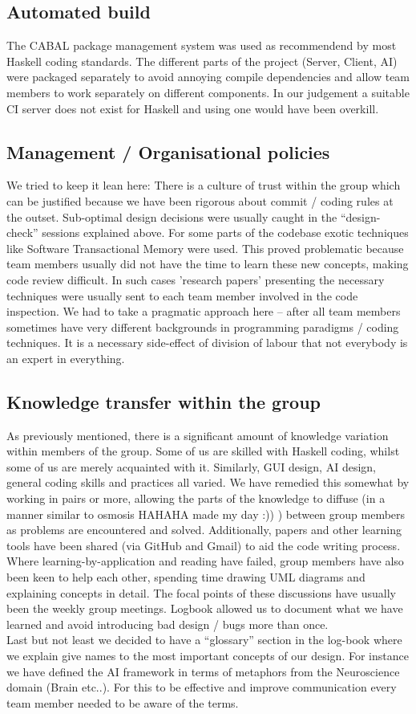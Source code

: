 \documentclass[11pt]{article}
\begin{document}
\subsection{Automated build}
The CABAL package management system was used as recommendend by most
Haskell coding standards. The different parts of the project (Server, Client,
AI) were packaged separately to avoid annoying compile dependencies and
allow team members to work separately on different components. In our judgement
a suitable CI server does not exist for Haskell and using one would have been 
overkill.

\subsection{Management / Organisational policies}
We tried to keep it lean here: There is a culture of trust within the group which
can be justified because we have been rigorous about commit / coding rules at the
outset. Sub-optimal design decisions were usually caught in the ``design-check'' sessions 
explained above. For some parts of the codebase exotic techniques like Software
Transactional Memory were used. This proved problematic because team members
usually did not have the time to learn these new concepts, making code review
difficult. In such cases 'research papers' presenting the necessary techniques
were usually sent to each team member involved in the code inspection. We had
to take a pragmatic approach here -- after all team members sometimes have very
different backgrounds in programming paradigms / coding techniques. It is a necessary
side-effect of division of labour that not everybody is an expert in everything.

\subsection{Knowledge transfer within the group}
As previously mentioned, there is a significant amount of knowledge variation
within members of the group. Some of us are skilled with Haskell coding, whilst
some of us are merely acquainted with it. Similarly, GUI design, AI design,
general coding skills and practices all varied. We have remedied this 
somewhat by working in pairs or more, allowing the parts of the knowledge to 
diffuse (in a manner similar to osmosis HAHAHA made my day :)) ) between group
members as problems are encountered and solved. Additionally, papers and other
learning tools have been shared (via GitHub and Gmail) to aid the code writing
process. Where  learning-by-application and reading have failed, group members have also been
keen to help each other, spending time drawing UML diagrams and explaining concepts
in detail. The focal points of these discussions have usually been the weekly 
group meetings. Logbook allowed us to document what we have learned and avoid
introducing bad design / bugs more than once. 
\\ 
Last but not least we decided to have a ``glossary'' section in the log-book 
where we explain give names to the most important concepts of our design. For instance
we have defined the AI framework in terms of metaphors from the Neuroscience
domain (Brain etc..). For this to be effective and improve communication every 
team member needed to be aware of the terms.
\end{document}
